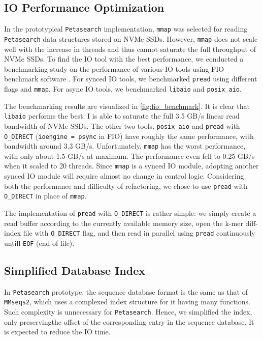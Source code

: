 \subsection{IO Performance Optimization} \label{section:io-performance}

In the prototypical \texttt{Petasearch} implementation, \texttt{mmap} was selected for reading \texttt{Petasearch} data structures stored on NVMe SSDs.
However, \texttt{mmap} does not scale well with the increase in threads \cite{papagiannis2020optimizing} and thus cannot saturate the full throughput of NVMe SSDs.
To find the IO tool with the best performance, we conducted a benchmarking study on the performance of various IO tools using FIO benchmark software \cite{AxboeFlexibleIOTester2022}.
For synced IO tools, we benchmarked \texttt{pread} using different flags and \texttt{mmap}.
For async IO tools, we benchmarked \texttt{libaio} and \texttt{posix\_aio}.

The benchmarking results are visualized in \autoref{fig:fio_benchmark}.
It is clear that \texttt{libaio} performs the best.
I is able to saturate the full 3.5 GB/s linear read bandwidth of NVMe SSDs.
The other two tools, \texttt{posix\_aio} and \texttt{pread} with \texttt{O\_DIRECT} (\texttt{ioengine = psync} in FIO) have roughly the same performance, with bandwidth around 3.3 GB/s.
Unfortunately, \texttt{mmap} has the worst performance, with only about 1.5 GB/s at maximum.
The performance even fell to 0.25 GB/s when it scaled to 20 threads.
Since \texttt{mmap} is a synced IO module, adopting another synced IO module will require almost no change in control logic.
Considering both the performance and difficulty of refactoring, we chose to use \texttt{pread} with \texttt{O\_DIRECT} in place of \texttt{mmap}.

The implementation of \texttt{pread} with \texttt{O\_DIRECT} is rather simple: we simply create a read buffer according to the currently available memory size, open the k-mer diff-index file with \texttt{O\_DIRECT} flag, and then read in parallel using \texttt{pread} continuously untill \texttt{EOF} (end of file).

\subsection{Simplified Database Index} \label{section:simplified-database-index}

In \texttt{Petasearch} prototype, the sequence database format is the same as that of \texttt{MMseqs2}, which uses a complexed index structure for it having many functions.
Such complexity is unnecessary for \texttt{Petasearch}.
Hence, we simplified the index, only preservingthe offset of the corresponding entry in the sequence database.
It is expected to reduce the IO time.

